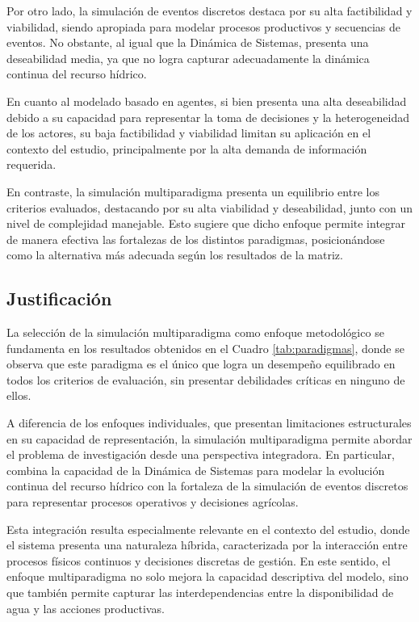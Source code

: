 \documentclass[12pt]{report}
\begin{document}
Por otro lado, la simulación de eventos discretos destaca por su alta factibilidad y viabilidad, siendo apropiada para modelar procesos productivos y secuencias de eventos. No obstante, al igual que la Dinámica de Sistemas, presenta una deseabilidad media, ya que no logra capturar adecuadamente la dinámica continua del recurso hídrico.

En cuanto al modelado basado en agentes, si bien presenta una alta deseabilidad debido a su capacidad para representar la toma de decisiones y la heterogeneidad de los actores, su baja factibilidad y viabilidad limitan su aplicación en el contexto del estudio, principalmente por la alta demanda de información requerida.

En contraste, la simulación multiparadigma presenta un equilibrio entre los criterios evaluados, destacando por su alta viabilidad y deseabilidad, junto con un nivel de complejidad manejable. Esto sugiere que dicho enfoque permite integrar de manera efectiva las fortalezas de los distintos paradigmas, posicionándose como la alternativa más adecuada según los resultados de la matriz.

\subsection{Justificación}

La selección de la simulación multiparadigma como enfoque metodológico se fundamenta en los resultados obtenidos en el Cuadro \ref{tab:paradigmas}, donde se observa que este paradigma es el único que logra un desempeño equilibrado en todos los criterios de evaluación, sin presentar debilidades críticas en ninguno de ellos.

A diferencia de los enfoques individuales, que presentan limitaciones estructurales en su capacidad de representación, la simulación multiparadigma permite abordar el problema de investigación desde una perspectiva integradora. En particular, combina la capacidad de la Dinámica de Sistemas para modelar la evolución continua del recurso hídrico con la fortaleza de la simulación de eventos discretos para representar procesos operativos y decisiones agrícolas.

Esta integración resulta especialmente relevante en el contexto del estudio, donde el sistema presenta una naturaleza híbrida, caracterizada por la interacción entre procesos físicos continuos y decisiones discretas de gestión. En este sentido, el enfoque multiparadigma no solo mejora la capacidad descriptiva del modelo, sino que también permite capturar las interdependencias entre la disponibilidad de agua y las acciones productivas.
\end{document}
